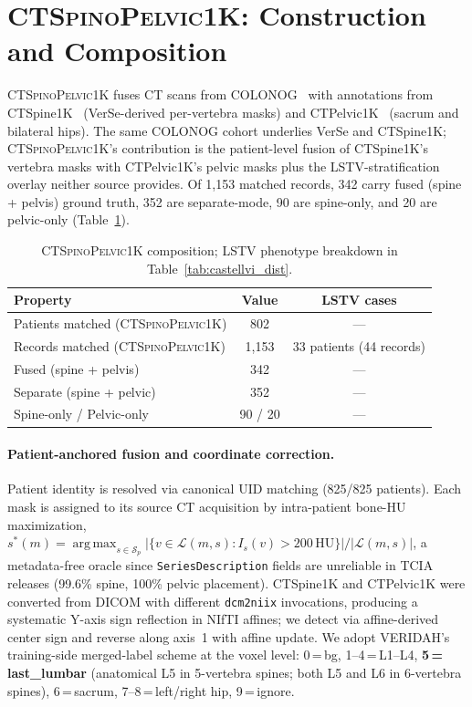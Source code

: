 \documentclass{article}
\DeclareMathOperator*{\argmax}{arg\,max}
\newcommand{\dataset}{\textsc{CTSpinoPelvic1K}}
\newcommand{\VERIDAH}{VERIDAH}
\newcommand{\VerSe}{VerSe}
\begin{document}
\section{\dataset{}: Construction and Composition}
\label{sec:dataset}

\dataset{} fuses CT scans from
COLONOG~\citep{Smith2015DataCOLONOGRAPHY} with annotations
from CTSpine1K~\citep{Deng2021CTSpine1K:Tomography}
(\VerSe{}-derived per-vertebra masks) and
CTPelvic1K~\citep{Liu2021DeepModels} (sacrum and bilateral
hips). The same COLONOG cohort underlies \VerSe{} and
CTSpine1K; \dataset{}'s contribution is the patient-level
fusion of CTSpine1K's vertebra masks with CTPelvic1K's
pelvic masks plus the LSTV-stratification overlay neither
source provides. Of 1{,}153 matched records, 342 carry
fused (spine + pelvis) ground truth, 352 are separate-mode,
90 are spine-only, and 20 are pelvic-only
(Table~\ref{tab:scan_stats}).

\begin{table}[t]
\caption{\dataset{} composition; LSTV phenotype
breakdown in Table~\ref{tab:castellvi_dist}.}
\label{tab:scan_stats}
\centering
\small
\begin{tabular}{lcc}
\toprule
\bfseries Property & \bfseries Value & \bfseries LSTV cases \\
\midrule
Patients matched (\dataset{})           & 802     & --- \\
Records matched (\dataset{})            & 1{,}153 & 33 patients (44 records) \\
\quad Fused (spine + pelvis)            & 342     & --- \\
\quad Separate (spine + pelvic)         & 352     & --- \\
\quad Spine-only / Pelvic-only          & 90 / 20 & --- \\
\bottomrule
\end{tabular}
\end{table}

\paragraph{Patient-anchored fusion and coordinate
correction.} Patient identity is resolved via canonical UID
matching (825/825 patients). Each mask is assigned to its
source CT acquisition by intra-patient bone-HU
maximization,
$s^*(m) = \argmax_{s \in \mathcal{S}_p}
|\{v \in \mathcal{L}(m, s) : I_s(v) > 200\,\text{HU}\}|/|\mathcal{L}(m, s)|$,
a metadata-free oracle since \texttt{SeriesDescription}
fields are unreliable in TCIA releases (99.6\% spine,
100\% pelvic placement). CTSpine1K and CTPelvic1K were
converted from DICOM with different \texttt{dcm2niix}
invocations, producing a systematic Y-axis sign reflection
in NIfTI affines; we detect via affine-derived center sign
and reverse along axis~1 with affine update. We adopt
\VERIDAH{}'s training-side merged-label scheme at the
voxel level: 0\,=\,bg, 1--4\,=\,L1--L4,
\textbf{5\,=\,last\_lumbar} (anatomical L5 in 5-vertebra
spines; both L5 and L6 in 6-vertebra spines), 6\,=\,sacrum,
7--8\,=\,left/right hip, 9\,=\,ignore.
\end{document}
